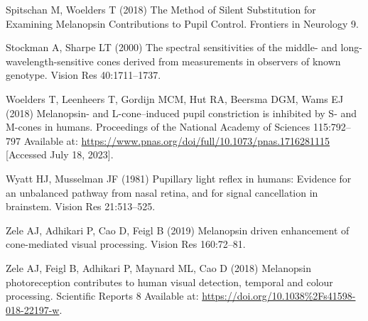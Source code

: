 \documentclass[
]{article}
\begin{document}
\leavevmode\hypertarget{ref-Spitschan2018}{}%
Spitschan M, Woelders T (2018) The Method of Silent Substitution for Examining Melanopsin Contributions to Pupil Control. Frontiers in Neurology 9.

\leavevmode\hypertarget{ref-Stockman2000}{}%
Stockman A, Sharpe LT (2000) The spectral sensitivities of the middle- and long-wavelength-sensitive cones derived from measurements in observers of known genotype. Vision Res 40:1711--1737.

\leavevmode\hypertarget{ref-Woelders2018}{}%
Woelders T, Leenheers T, Gordijn MCM, Hut RA, Beersma DGM, Wams EJ (2018) Melanopsin- and L-cone--induced pupil constriction is inhibited by S- and M-cones in humans. Proceedings of the National Academy of Sciences 115:792--797 Available at: \url{https://www.pnas.org/doi/full/10.1073/pnas.1716281115} {[}Accessed July 18, 2023{]}.

\leavevmode\hypertarget{ref-Wyatt1981}{}%
Wyatt HJ, Musselman JF (1981) Pupillary light reflex in humans: Evidence for an unbalanced pathway from nasal retina, and for signal cancellation in brainstem. Vision Res 21:513--525.

\leavevmode\hypertarget{ref-Zele2019}{}%
Zele AJ, Adhikari P, Cao D, Feigl B (2019) Melanopsin driven enhancement of cone-mediated visual processing. Vision Res 160:72--81.

\leavevmode\hypertarget{ref-Zele2018}{}%
Zele AJ, Feigl B, Adhikari P, Maynard ML, Cao D (2018) Melanopsin photoreception contributes to human visual detection, temporal and colour processing. Scientific Reports 8 Available at: \url{https://doi.org/10.1038\%2Fs41598-018-22197-w}.
\end{document}
